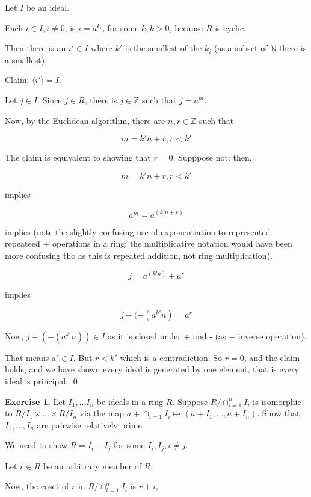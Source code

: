 \documentclass[11pt,oneside]{article}
\numberwithin{equation}{section}
\theoremstyle{definition}
\newtheorem{exercise}{Exercise}
\def\ZZ{\mathbb{Z}}
\def\NN{\mathbb{N}}
\begin{document}
\begin{solution}
  Let $I$ be an ideal.

  Each $i \in I, i \neq 0$, is $i=a^{k_i}$, for some $k, k>0$, because $R$ is cyclic.

  Then there is an $i' \in I$ where $k'$ is the smallest of the $k_i$
  (as a subset of $\NN$ there is a smallest).

  Claim:  $ \langle i' \rangle = I$.

  Let $j \in I$.  Since $j \in R$, there is $j \in \ZZ$ such that $j = a^m$.

  Now, by the Euclidean algorithm, there are $n, r \in \ZZ$ such that

  $$
  m = k' n + r, r<k'
  $$

  The claim is equivalent to showing that $r=0$.  Supppose not: then,

  $$
  m = k' n + r, r<k'
  $$

  implies

  $$
  a^m = a^{(k'n + r)}
  $$

  implies (note the slightly confusing use of exponentiation to
  represented repeateed $+$ operations in a ring; the multiplicative
  notation would have been more confusing tho as this is repeated
  addition, not ring multiplication).  

  $$
  j = a^{(k'n)} + a^r
  $$

  implies

  $$
  j + (-(a^{k'}n) = a^r
  $$

  Now, $j + (-(a^{k'}n)) \in I$ as it is closed under + and - (as + inverse operation).

  That means $a^r \in I$.  But $ r < k'$ which is a contradiction.  So
  $r=0$, and the claim holds, and we have shown every ideal is generated by one element, that is
  every ideal is principal.
  \qed
  
  
\end{solution}
\begin{exercise}
  Let $I_1, ... I_n$ be ideals in a ring $R$.  Suppose $R/\cap_{i=1}^n
  I_i$ is isomorphic to $R/I_1 \times ... \times R/I_n$ via the map
  $a+\cap_{i=1}I_i \mapsto (a + I_1, ... , a+ I_n)$.  Show that $I_1,
  ... , I_n$ are pairwise relatively prime.
\end{exercise}
\begin{solution}

  We need to show $R = I_i + I_j$ for some $I_i, I_j, i \neq j$.

  Let $ r \in R$ be an arbitrary member of $R$.

  Now, the coset of $r$ in  $R/\cap_{i=1}^n I_i$ is $r + i$, 
\end{solution}

\begin{comment}
  \begin{exercise}
    problem
  \end{exercise}
  \begin{solution}
    \begin{enumerate}[(a)]
    \item
      first answer
    \end{enumerate}
  \end{solution}
\end{comment}
\end{document}
